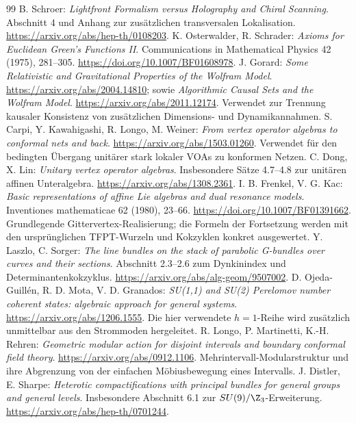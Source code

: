 \begin{thebibliography}{99}
 B. Schroer: \emph{Lightfront Formalism versus Holography and Chiral Scanning}. Abschnitt 4 und Anhang zur zusätzlichen transversalen Lokalisation. \url{https://arxiv.org/abs/hep-th/0108203}.
 K. Osterwalder, R. Schrader: \emph{Axioms for Euclidean Green's Functions II}. Communications in Mathematical Physics 42 (1975), 281--305. \url{https://doi.org/10.1007/BF01608978}.
 J. Gorard: \emph{Some Relativistic and Gravitational Properties of the Wolfram Model}. \url{https://arxiv.org/abs/2004.14810}; sowie \emph{Algorithmic Causal Sets and the Wolfram Model}. \url{https://arxiv.org/abs/2011.12174}. Verwendet zur Trennung kausaler Konsistenz von zusätzlichen Dimensions- und Dynamikannahmen.
 S. Carpi, Y. Kawahigashi, R. Longo, M. Weiner: \emph{From vertex operator algebras to conformal nets and back}. \url{https://arxiv.org/abs/1503.01260}. Verwendet für den bedingten Übergang unitärer stark lokaler VOAs zu konformen Netzen.
 C. Dong, X. Lin: \emph{Unitary vertex operator algebras}. Insbesondere Sätze 4.7--4.8 zur unitären affinen Unteralgebra. \url{https://arxiv.org/abs/1308.2361}.
 I. B. Frenkel, V. G. Kac: \emph{Basic representations of affine Lie algebras and dual resonance models}. Inventiones mathematicae 62 (1980), 23--66. \url{https://doi.org/10.1007/BF01391662}. Grundlegende Gittervertex-Realisierung; die Formeln der Fortsetzung werden mit den ursprünglichen TFPT-Wurzeln und Kokzyklen konkret ausgewertet.
 Y. Laszlo, C. Sorger: \emph{The line bundles on the stack of parabolic G-bundles over curves and their sections}. Abschnitt 2.3--2.6 zum Dynkinindex und Determinantenkokzyklus. \url{https://arxiv.org/abs/alg-geom/9507002}.
 D. Ojeda-Guillén, R. D. Mota, V. D. Granados: \emph{SU(1,1) and SU(2) Perelomov number coherent states: algebraic approach for general systems}. \url{https://arxiv.org/abs/1206.1555}. Die hier verwendete $h=1$-Reihe wird zusätzlich unmittelbar aus den Strommoden hergeleitet.
 R. Longo, P. Martinetti, K.-H. Rehren: \emph{Geometric modular action for disjoint intervals and boundary conformal field theory}. \url{https://arxiv.org/abs/0912.1106}. Mehrintervall-Modularstruktur und ihre Abgrenzung von der einfachen Möbiusbewegung eines Intervalls.
 J. Distler, E. Sharpe: \emph{Heterotic compactifications with principal bundles for general groups and general levels}. Insbesondere Abschnitt 6.1 zur $SU(9)/\Z_3$-Erweiterung. \url{https://arxiv.org/abs/hep-th/0701244}.

\end{thebibliography}
